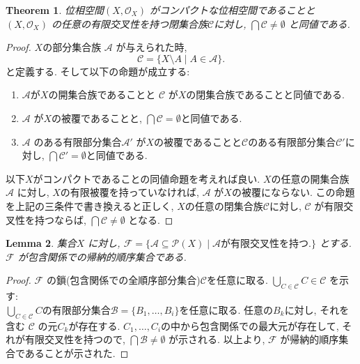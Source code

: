 \documentclass[lualatex]{ltjsbook}
\newtheorem{theorem}{Theorem}[section]
\newtheorem{lemma}[theorem]{Lemma}
\theoremstyle{remark}
\theoremstyle{plain}
\begin{document}
\begin{theorem}
	位相空間$\left( X , \mathcal{O}_{X} \right)$ がコンパクトな位相空間であることと$\left( X , \mathcal{O}_{X} \right)$ の任意の有限交叉性を持つ閉集合族$\mathcal{C}$に対し, $\bigcap \mathcal{C} \neq \emptyset $ と同値である.
\end{theorem}

\begin{proof}
	$X$の部分集合族 $\mathcal{A}$ が与えられた時, 
	\[
	\mathcal{C} = \{X \setminus A  \mid  A \in \mathcal{A} \} 
	.\] 
	と定義する. そして以下の命題が成立する:
	\begin{enumerate}
		\item $\mathcal{A}$が$X$の開集合族であることと $\mathcal{C}$ が$X$の閉集合族であることと同値である.
		\item $\mathcal{A}$ が$X$の被覆であることと,  $\bigcap \mathcal{C} = \emptyset$と同値である.
		\item $\mathcal{A}$ のある有限部分集合$\mathcal{A}'$ が$X$の被覆であることと$\mathcal{C}$のある有限部分集合$\mathcal{C}'$に対し, $\bigcap \mathcal{C}' = \emptyset$と同値である.
	\end{enumerate}
	以下$X$がコンパクトであることの同値命題を考えれば良い.  $X$の任意の開集合族$\mathcal{A}$ に対し, $X$の有限被覆を持っていなければ,  $\mathcal{A}$ が$X$の被覆にならない.
	この命題を上記の三条件で書き換えると正しく,  $X$の任意の閉集合族$\mathcal{C}$に対し,  $\mathcal{C}$ が有限交叉性を持つならば, $\bigcap \mathcal{C} \neq \emptyset$ となる.
\end{proof}

\begin{lemma}
	集合$X$ に対し, $\mathcal{F }= \{ \mathcal{A} \subseteq \mathcal{P}(X)  \mid  \mathcal{A} \text{が有限交叉性を持つ.}\} $ とする. $\mathcal{F}$ が包含関係での帰納的順序集合である.
\end{lemma}

\begin{proof}
	$\mathcal{F}$ の鎖(包含関係での全順序部分集合)$ \mathcal{C}$を任意に取る. $\bigcup_{C \in \mathcal{C}} C \in \mathcal{C}$ を示す:\\
	$\bigcup_{C \in \mathcal{C}} C$の有限部分集合$\mathcal{B}=\{B_1, \ldots , B_i\} $を任意に取る. 任意の$B_k$に対し, それを含む $\mathcal{C}$ の元$C_k$が存在する.  $C_1, \ldots ,C_i $の中から包含関係での最大元が存在して, それが有限交叉性を持つので, $\bigcap \mathcal{B} \neq \emptyset$ が示される.
以上より, $\mathcal{F}$ が帰納的順序集合であることが示された.
\end{proof}
\end{document}
